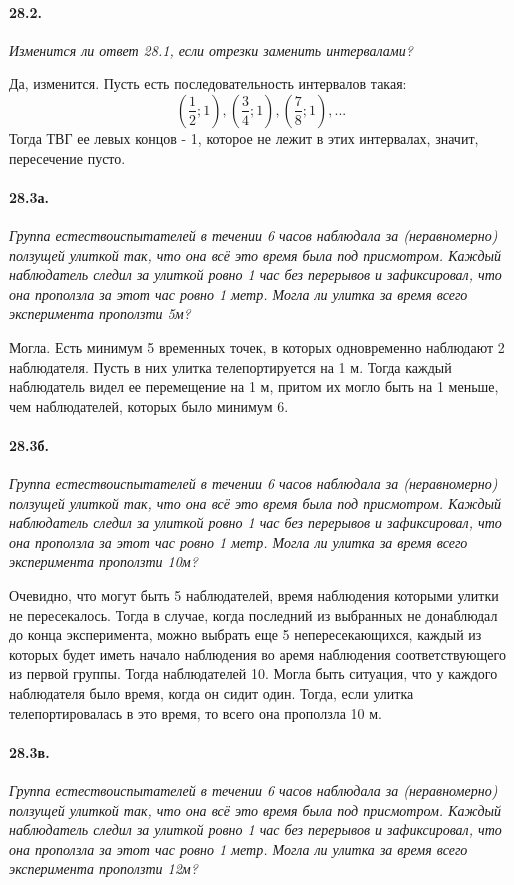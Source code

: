 \documentclass{book}
\begin{document}
\paragraph{28.2.}
\textit{Изменится ли ответ 28.1, если отрезки заменить интервалами?}

Да, изменится. Пусть есть последовательность интервалов такая:
\[(\frac{1}{2}; 1), (\frac{3}{4}; 1), (\frac{7}{8}; 1), ...\] Тогда ТВГ ее левых концов - 1, которое не лежит в этих интервалах, значит, пересечение пусто.

\paragraph{28.3а.}
\textit{Группа естествоиспытателей в течении 6 часов наблюдала за (неравномерно)
ползущей улиткой так, что она всё это время была под присмотром. Каждый наблюдатель
следил за улиткой ровно 1 час без перерывов и зафиксировал, что она проползла за этот
час ровно 1 метр. Могла ли улитка за время всего эксперимента проползти 5м?}

Могла. Есть минимум 5 временных точек, в которых одновременно наблюдают 2 наблюдателя. Пусть в них улитка телепортируется на 1 м. Тогда каждый наблюдатель видел ее перемещение на 1 м, притом их могло быть на 1 меньше, чем наблюдателей, которых было минимум 6.

\paragraph{28.3б.}
\textit{Группа естествоиспытателей в течении 6 часов наблюдала за (неравномерно)
ползущей улиткой так, что она всё это время была под присмотром. Каждый наблюдатель
следил за улиткой ровно 1 час без перерывов и зафиксировал, что она проползла за этот
час ровно 1 метр. Могла ли улитка за время всего эксперимента проползти 10м?}

Очевидно, что могут быть 5 наблюдателей, время наблюдения которыми улитки не пересекалось. Тогда в случае, когда последний из выбранных не донаблюдал до конца эксперимента, можно выбрать еще 5 непересекающихся, каждый из которых будет иметь начало наблюдения во аремя наблюдения соответствующего из первой группы. Тогда наблюдателей 10. Могла быть ситуация, что у каждого наблюдателя было время, когда он сидит один. Тогда, если улитка телепортировалась в это время, то всего она проползла 10 м.


\paragraph{28.3в.}
\textit{Группа естествоиспытателей в течении 6 часов наблюдала за (неравномерно)
ползущей улиткой так, что она всё это время была под присмотром. Каждый наблюдатель
следил за улиткой ровно 1 час без перерывов и зафиксировал, что она проползла за этот
час ровно 1 метр. Могла ли улитка за время всего эксперимента проползти 12м?}
\end{document}
